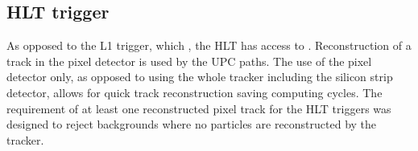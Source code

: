     \subsection{HLT trigger}
      As opposed to the L1 trigger, which \DIFdelbegin {}\DIFdelend \DIFaddbegin {}\DIFaddend , the HLT has access to \DIFdelbegin {}\DIFdelend \DIFaddbegin {}\DIFaddend . 
      Reconstruction of a track in the pixel detector is used by the UPC paths.
      The use of the pixel detector only, as opposed to using the whole tracker 
        including the silicon strip detector, allows for quick track 
        reconstruction saving computing cycles.
      The requirement of at least one reconstructed pixel track for the HLT 
        triggers was designed to reject backgrounds where no particles are 
        reconstructed by the tracker. 
